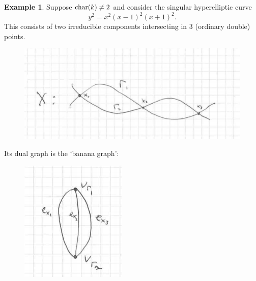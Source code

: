 \documentclass[12pt]{amsart}
\numberwithin{equation}{section}
\theoremstyle{remark}
\theoremstyle{definition}
\newtheorem{example}[equation]{Example}
\theoremstyle{definition}
\theoremstyle{definition}
\theoremstyle{definition}
\theoremstyle{definition}
\theoremstyle{definition}
\begin{document}
\begin{example} \label{dual graph ex 1}
Suppose $\textup{char}(k)\neq 2$ and consider the singular hyperelliptic curve 
\[y^2=x^2(x-1)^2(x+1)^2.\]
This consists of two irreducible components intersecting in $3$ (ordinary double) points. 
\begin{figure} [!htb] 
\includegraphics[angle=0,scale=0.5]{curve_1}
\end{figure}

Its dual graph is the `banana graph':

\begin{figure} [!htb] 
\includegraphics[angle=0,scale=0.6]{dual_graph_1}
\end{figure}
\end{example}
\end{document}
